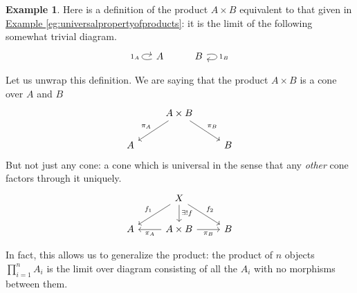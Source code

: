 \documentclass[a4paper,10pt]{scrreprt}
\theoremstyle{definition}
\newtheorem{example}{Example}[section]
\theoremstyle{plain}
\theoremstyle{remark}
\begin{document}
\begin{example}
  Here is a definition of the product $A \times B$ equivalent to that given in \hyperref[eg:universalpropertyofproducts]{Example \ref*{eg:universalpropertyofproducts}}: it is the limit of the following somewhat trivial diagram.
  \begin{equation*}
    \begin{tikzcd}
      A
      \arrow[loop left, "1_{A}"]
      & B
      \arrow[loop right, "1_{B}"]
    \end{tikzcd}
  \end{equation*}

  Let us unwrap this definition. We are saying that the product $A \times B$ is a cone over $A$ and $B$
  \begin{equation*}
    \begin{tikzcd}
      & A \times B
      \arrow[dl, swap, "\pi_{A}"]
      \arrow[dr, "\pi_{B}"]
      \\
      A & & B
    \end{tikzcd}
  \end{equation*}
  But not just any cone: a cone which is universal in the sense that any \emph{other} cone factors through it uniquely.
  \begin{equation*}
    \begin{tikzcd}
      & X
      \arrow[dl, swap, "f_{1}"]
      \arrow[dr, "f_{2}"]
      \arrow[d, "\exists!f"]
      \\
      A 
      & A \times B 
      \arrow[l, "\pi_{A}"]
      \arrow[r, swap, "\pi_{B}"]
      & B
    \end{tikzcd}
  \end{equation*}

  In fact, this allows us to generalize the product: the product of $n$ objects $\prod_{i=1}^{n} A_{i}$ is the limit over diagram consisting of all the $A_{i}$ with no morphisms between them.
\end{example}
\end{document}
